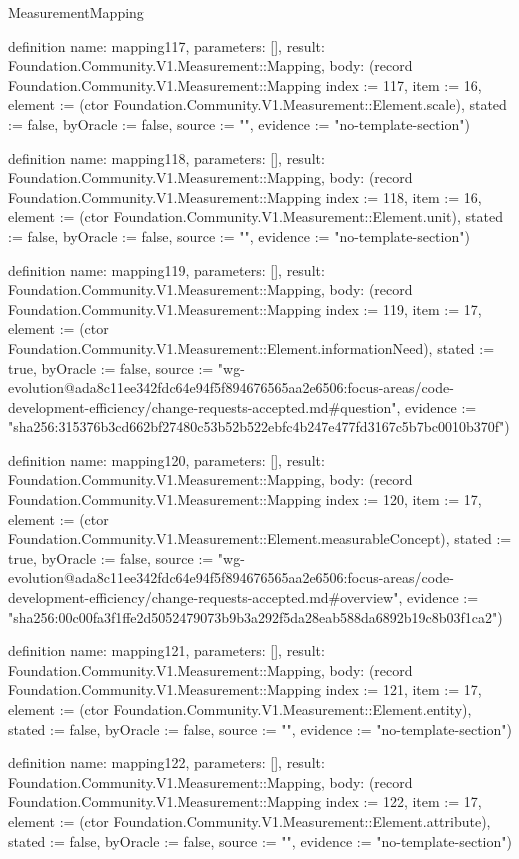\begin{lexlean}{MeasurementMapping}
\begin{semanticmodule}
definition{
  name: mapping117,
  parameters: [],
  result: Foundation.Community.V1.Measurement::Mapping,
  body: (record Foundation.Community.V1.Measurement::Mapping {index := 117, item := 16, element := (ctor Foundation.Community.V1.Measurement::Element.scale), stated := false, byOracle := false, source := "", evidence := "no-template-section"})
}

definition{
  name: mapping118,
  parameters: [],
  result: Foundation.Community.V1.Measurement::Mapping,
  body: (record Foundation.Community.V1.Measurement::Mapping {index := 118, item := 16, element := (ctor Foundation.Community.V1.Measurement::Element.unit), stated := false, byOracle := false, source := "", evidence := "no-template-section"})
}

definition{
  name: mapping119,
  parameters: [],
  result: Foundation.Community.V1.Measurement::Mapping,
  body: (record Foundation.Community.V1.Measurement::Mapping {index := 119, item := 17, element := (ctor Foundation.Community.V1.Measurement::Element.informationNeed), stated := true, byOracle := false, source := "wg-evolution@ada8c11ee342fdc64e94f5f894676565aa2e6506:focus-areas/code-development-efficiency/change-requests-accepted.md#question", evidence := "sha256:315376b3cd662bf27480c53b52b522ebfc4b247e477fd3167c5b7bc0010b370f"})
}

definition{
  name: mapping120,
  parameters: [],
  result: Foundation.Community.V1.Measurement::Mapping,
  body: (record Foundation.Community.V1.Measurement::Mapping {index := 120, item := 17, element := (ctor Foundation.Community.V1.Measurement::Element.measurableConcept), stated := true, byOracle := false, source := "wg-evolution@ada8c11ee342fdc64e94f5f894676565aa2e6506:focus-areas/code-development-efficiency/change-requests-accepted.md#overview", evidence := "sha256:00c00fa3f1ffe2d5052479073b9b3a292f5da28eab588da6892b19c8b03f1ca2"})
}

definition{
  name: mapping121,
  parameters: [],
  result: Foundation.Community.V1.Measurement::Mapping,
  body: (record Foundation.Community.V1.Measurement::Mapping {index := 121, item := 17, element := (ctor Foundation.Community.V1.Measurement::Element.entity), stated := false, byOracle := false, source := "", evidence := "no-template-section"})
}

definition{
  name: mapping122,
  parameters: [],
  result: Foundation.Community.V1.Measurement::Mapping,
  body: (record Foundation.Community.V1.Measurement::Mapping {index := 122, item := 17, element := (ctor Foundation.Community.V1.Measurement::Element.attribute), stated := false, byOracle := false, source := "", evidence := "no-template-section"})
}


\end{semanticmodule}
\end{lexlean}
